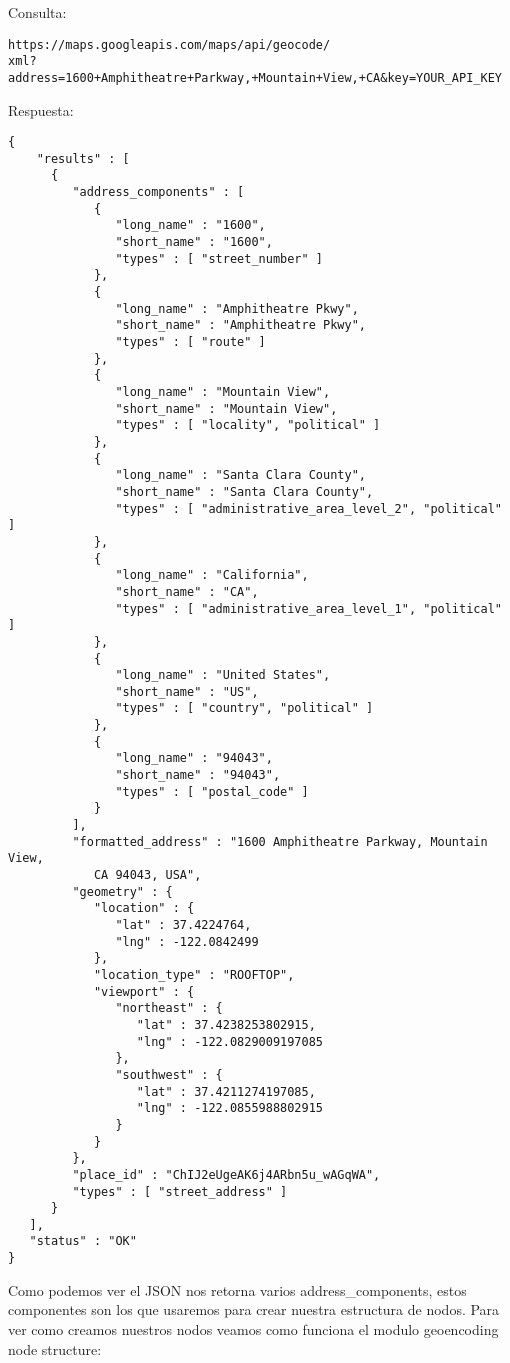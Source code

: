 \newpage
Consulta:\\
\begin{lstlisting}
https://maps.googleapis.com/maps/api/geocode/
xml?address=1600+Amphitheatre+Parkway,+Mountain+View,+CA&key=YOUR_API_KEY
\end{lstlisting}
Respuesta:
\begin{lstlisting}
{
    "results" : [
      {
         "address_components" : [
            {
               "long_name" : "1600",
               "short_name" : "1600",
               "types" : [ "street_number" ]
            },
            {
               "long_name" : "Amphitheatre Pkwy",
               "short_name" : "Amphitheatre Pkwy",
               "types" : [ "route" ]
            },
            {
               "long_name" : "Mountain View",
               "short_name" : "Mountain View",
               "types" : [ "locality", "political" ]
            },
            {
               "long_name" : "Santa Clara County",
               "short_name" : "Santa Clara County",
               "types" : [ "administrative_area_level_2", "political" ]
            },
            {
               "long_name" : "California",
               "short_name" : "CA",
               "types" : [ "administrative_area_level_1", "political" ]
            },
            {
               "long_name" : "United States",
               "short_name" : "US",
               "types" : [ "country", "political" ]
            },
            {
               "long_name" : "94043",
               "short_name" : "94043",
               "types" : [ "postal_code" ]
            }
         ],
         "formatted_address" : "1600 Amphitheatre Parkway, Mountain View,
			CA 94043, USA",
         "geometry" : {
            "location" : {
               "lat" : 37.4224764,
               "lng" : -122.0842499
            },
            "location_type" : "ROOFTOP",
            "viewport" : {
               "northeast" : {
                  "lat" : 37.4238253802915,
                  "lng" : -122.0829009197085
               },
               "southwest" : {
                  "lat" : 37.4211274197085,
                  "lng" : -122.0855988802915
               }
            }
         },
         "place_id" : "ChIJ2eUgeAK6j4ARbn5u_wAGqWA",
         "types" : [ "street_address" ]
      }
   ],
   "status" : "OK"
}
\end{lstlisting}

Como podemos ver el JSON nos retorna varios address\_components, estos componentes son los que usaremos para crear nuestra estructura de nodos. Para ver como creamos nuestros nodos veamos como funciona el modulo geoencoding node structure:

